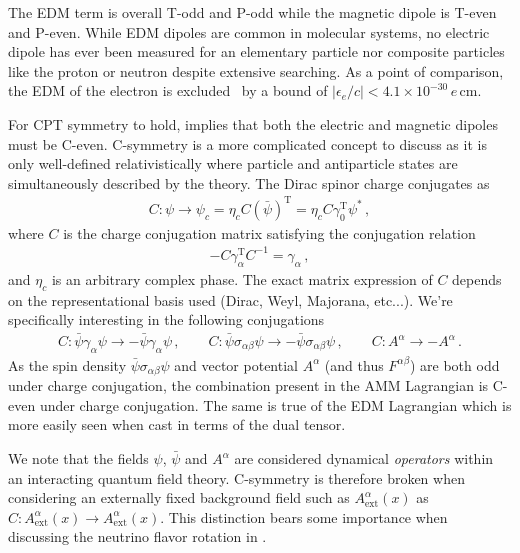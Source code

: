 The EDM term  is overall T-odd and P-odd while the magnetic dipole is T-even and P-even. While EDM dipoles are common in molecular systems, no electric dipole has ever been measured for an elementary particle nor composite particles like the proton or neutron despite extensive searching. As a point of comparison, the EDM of the electron is excluded~\citep{ACME:2018yjb,Roussy:2022cmp} by a bound of $|\epsilon_{e}/c|<4.1\times10^{-30}\, e\,\mathrm{cm}$.

For CPT symmetry to hold,  implies that both the electric and magnetic dipoles must be C-even. C-symmetry is a more complicated concept to discuss as it is only well-defined relativistically where particle and antiparticle states are simultaneously described by the theory. The Dirac spinor charge conjugates as
\begin{align}
    \label{c:1}
    C:\psi\rightarrow\psi_{c}=\eta_{c}C(\bar\psi)^\mathrm{T}= \eta_{c}C\gamma_{0}^\mathrm{T}\psi^{*}\,,
\end{align}
where $C$ is the charge conjugation matrix satisfying the conjugation relation
\begin{align}
    \label{c:2}
    -C\gamma_{\alpha}^\mathrm{T}C^{-1}=\gamma_{\alpha}\,,
\end{align}
and $\eta_{c}$ is an arbitrary complex phase. The exact matrix expression of $C$ depends on the representational basis used (Dirac, Weyl, Majorana, etc...). We're specifically interesting in the following conjugations
\begin{align}
    \label{c:3}
    C:\bar\psi\gamma_{\alpha}\psi\rightarrow-\bar\psi\gamma_{\alpha}\psi\,,\qquad
    C:\bar\psi\sigma_{\alpha\beta}\psi\rightarrow-\bar\psi\sigma_{\alpha\beta}\psi\,,\qquad
    C:A^{\alpha}\rightarrow-A^{\alpha}\,.
\end{align}
As the spin density $\bar\psi\sigma_{\alpha\beta}\psi$ and vector potential $A^{\alpha}$ (and thus $F^{\alpha\beta}$) are both odd under charge conjugation, the combination present in the AMM Lagrangian  is C-even under charge conjugation. The same is true of the EDM Lagrangian  which is more easily seen when cast in terms of the dual tensor.

We note that the fields $\psi$, $\bar\psi$ and $A^{\alpha}$ are considered dynamical \emph{operators} within an interacting quantum field theory. C-symmetry is therefore broken when considering an externally fixed background field such as $A_\mathrm{ext}^{\alpha}(x)$ as $C:A_\mathrm{ext}^{\alpha}(x)\rightarrow A_\mathrm{ext}^{\alpha}(x)$. This distinction bears some importance when discussing the neutrino flavor rotation in .